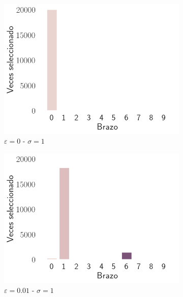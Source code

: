\documentclass[12pt]{article}
\begin{document}
\begin{figure}[h]
        \begin{subfigure}[H]{0.3\textwidth}
            \includegraphics[width=\textwidth]{../img/arm_sigma_1_epsilon_0}
            \caption{$\varepsilon=0$ - $\sigma=1$}
            \label{fig:arms_selected_1_0}
        \end{subfigure}
        \begin{subfigure}[H]{0.3\textwidth}
            \includegraphics[width=\textwidth]{../img/arm_sigma_1_epsilon_0.01}
            \caption{$\varepsilon=0.01$ - $\sigma=1$}
            \label{fig:arms_selected_1_0.01}
        \end{subfigure}
        \begin{subfigure}[H]{0.3\textwidth}

\end{subfigure}
\end{figure}
\end{document}
